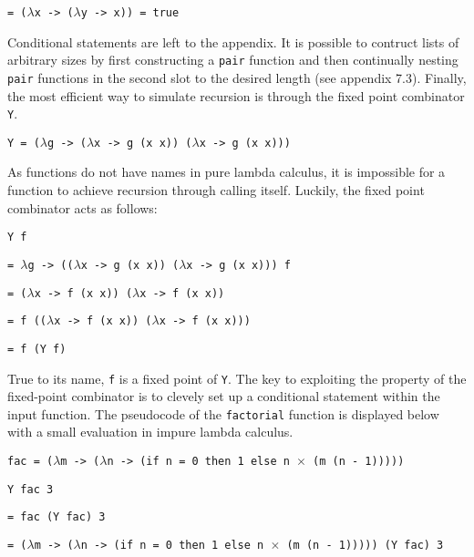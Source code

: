 \documentclass[11pt]{article}
\begin{document}
\hspace{2.5cm}\texttt{= ($\lambda$x -> ($\lambda$y -> x)) = true}


Conditional statements are left to the appendix. It is possible to contruct lists of arbitrary sizes by first constructing a \texttt{pair} function and then continually nesting \texttt{pair} functions in the second slot to the desired length (see appendix 7.3). Finally, the most efficient way to simulate recursion is through the fixed point combinator \texttt{Y}.

\hspace{2cm}\texttt{Y = ($\lambda$g -> ($\lambda$x -> g (x x)) ($\lambda$x -> g (x x)))}

As functions do not have names in pure lambda calculus, it is impossible for a function to achieve recursion through calling itself. Luckily, the fixed point combinator acts as follows:

\hspace{2cm}\texttt{Y f}

\hspace{2.5cm}\texttt{= $\lambda$g -> (($\lambda$x -> g (x x)) ($\lambda$x -> g (x x))) f}

\hspace{2.5cm}\texttt{= ($\lambda$x -> f (x x)) ($\lambda$x -> f (x x))}

\hspace{2.5cm}\texttt{= f (($\lambda$x -> f (x x)) ($\lambda$x -> f (x x)))}

\hspace{2.5cm}\texttt{= f (Y f)}

True to its name, \texttt{f} is a fixed point of \texttt{Y}. The key to exploiting the property of the fixed-point combinator is to clevely set up a conditional statement within the input function. The pseudocode of the \texttt{factorial} function is displayed below with a small evaluation in impure lambda calculus.

\small
\hspace{0.5cm}\texttt{fac = ($\lambda$m -> ($\lambda$n -> (if n = 0 then 1 else n $\times$ (m (n - 1)))))}

\hspace{0.5cm}\texttt{Y fac 3}

\hspace{1cm}\texttt{= fac (Y fac) 3}

\hspace{1cm}\texttt{= ($\lambda$m -> ($\lambda$n -> (if n = 0 then 1 else n $\times$ (m (n - 1))))) (Y fac) 3}
\end{document}
